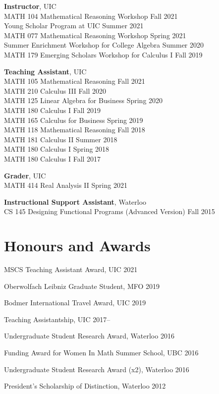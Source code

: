 \documentclass[letterpaper]{article}
\makeatletter
\renewenvironment{itemize}{
  \begin{list}{}{
    \setlength{\leftmargin}{1.5em}
  }
}{
  \end{list}
}
\newcommand*{\sectionbookmark}[1][]{ 
  \bookmark[ 
    level=section, 
    dest=\@currentHref, 
    #1 
  ] 
}
\makeatother
\begin{document}
\begin{itemize}
\item {\bf Instructor}, UIC \\
  MATH 104 Mathematical Reasoning Workshop \hfill Fall 2021 \\
  Young Scholar Program at UIC \hfill Summer 2021 \\
  MATH 077 Mathematical Reasoning Workshop \hfill Spring 2021 \\
  Summer Enrichment Workshop for College Algebra \hfill Summer 2020 \\
  MATH 179 Emerging Scholars Workshop for Calculus I \hfill Fall 2019 

\item  {\bf Teaching Assistant}, UIC \\
  MATH 105 Mathematical Reasoning \hfill Fall 2021 \\
  MATH 210 Calculus III \hfill Fall 2020 \\
  MATH 125 Linear Algebra for Business \hfill Spring 2020 \\ 
  MATH 180 Calculus I \hfill Fall 2019 \\
  MATH 165 Calculus for Business \hfill Spring 2019 \\ 
  MATH 118 Mathematical Reasoning \hfill Fall 2018 \\
  MATH 181 Calculus II \hfill Summer 2018 \\ 
  MATH 180 Calculus I \hfill Spring 2018 \\ 
  MATH 180 Calculus I \hfill Fall 2017

\item {\bf Grader}, UIC \\
  MATH 414 Real Analysis II \hfill Spring 2021
  
\item {\bf Instructional Support Assistant}, Waterloo \\
  CS 145 Designing Functional Programs (Advanced Version) \hfill Fall 2015
\end{itemize}

\section*{\sc Honours and Awards}
\sectionbookmark{Honours and Awards}

\begin{etaremune}
\item MSCS Teaching Assistant Award, UIC \hfill 2021
\item Oberwolfach Leibniz Graduate Student, MFO \hfill 2019
\item Bodmer International Travel Award, UIC \hfill 2019
\item Teaching Assistantship, UIC \hfill 2017--
\item Undergraduate Student Research Award, Waterloo \hfill 2016 
\item Funding Award for Women In Math Summer School, UBC \hfill 2016
\item Undergraduate Student Research Award (x2), Waterloo \hfill 2016
\item President's Scholarship of Distinction, Waterloo \hfill 2012
\end{etaremune}
\end{document}
